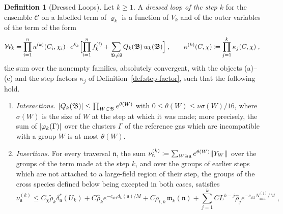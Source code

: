 \documentclass[11pt]{preprint}
\DeclarePairedDelimiter{\abs}{\lvert}{\rvert}
\DeclarePairedDelimiter{\norm}{\lVert}{\rVert}
\numberwithin{equation}{section}
\theoremstyle{definition}
\newtheorem{definition}[theorem]{Definition}
\theoremstyle{remark}
\theoremstyle{plain}
\begin{document}
\begin{definition}[Dressed Loops]\label{def:dressed-loop}
Let $k \geq 1$. A \emph{dressed loop of the step $k$} for the ensemble $\mathcal C$ on a labelled term of $\varrho_k$ is a function of $V_k$ and of the outer variables of the term of the form
\begin{equation}\label{eq:dressed-loop}
    \mathcal W_k = \prod_{i=1}^{n}\kappa^{(k)}(C_i, \chi_i)\cdot e^{\mathcal E_k}\Bigl[\prod_{i=1}^{n}f^{(i)}_k + \sum_{\mathfrak B \neq \emptyset}Q_k(\mathfrak B)\,w_k(\mathfrak B)\Bigr]\;,
    \qquad
    \kappa^{(k)}(C, \chi) \coloneqq \prod_{j=1}^{k}\kappa_j(C, \chi)\;,
\end{equation}
the sum over the nonempty families, absolutely convergent, with the objects (a)--(e) and the step factors $\kappa_j$ of Definition~\ref{def:step-factor}, such that the following hold.
\begin{enumerate}[label=(\roman*)]
\item \emph{Interactions.} $\abs{Q_k(\mathfrak B)} \leq \prod_{W \in \mathfrak B}e^{\theta(W)}$ with $0 \leq \theta(W) \leq \nu\sigma(W)/16$, where $\sigma(W)$ is the size of $W$ at the step at which it was made; more precisely, the sum of $\abs{\varphi_k(\Gamma)}$ over the clusters $\Gamma$ of the reference gas which are incompatible with a group $W$ is at most $\theta(W)$.
\item \emph{Insertions.} For every traversal $\mathfrak n$, the sum $\nu^{(k)}_{\mathfrak n} \coloneqq \sum_{W \ni \mathfrak n}e^{\theta(W)}\norm{Y_W}$ over the groups of the term made at the step $k$, and over the groups of earlier steps which are not attached to a large-field region of their step, the groups of the cross species defined below being excepted in both cases, satisfies
\begin{equation}\label{eq:insertion-bound}
    \nu^{(k)}_{\mathfrak n} \leq C_\chi\tilde\rho_k\delta^{*}_{\mathfrak n}(U_k) + C\hat\rho_ke^{-c_{\mathrm{att}}d_k(\mathfrak n)/M} + C\rho_{t,k}\,\mathfrak m_k(\mathfrak n) + \sum_{j=1}^{k}CL^{k-j}\hat\rho_je^{-c_{\mathrm{att}}N^{(j)}_{\min}/M}\;,
\end{equation}

\end{enumerate}
\end{definition}
\end{document}
